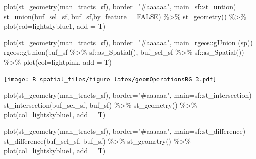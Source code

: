 \documentclass[
  11pt,
]{book}
\newenvironment{Shaded}{\begin{snugshade}}{\end{snugshade}}
\newcommand{\AttributeTok}[1]{\textcolor[rgb]{0.77,0.63,0.00}{#1}}
\newcommand{\ConstantTok}[1]{\textcolor[rgb]{0.00,0.00,0.00}{#1}}
\newcommand{\FunctionTok}[1]{\textcolor[rgb]{0.00,0.00,0.00}{#1}}
\newcommand{\NormalTok}[1]{#1}
\newcommand{\SpecialCharTok}[1]{\textcolor[rgb]{0.00,0.00,0.00}{#1}}
\newcommand{\StringTok}[1]{\textcolor[rgb]{0.31,0.60,0.02}{#1}}
\begin{document}
\begin{Shaded}
\begin{Highlighting}[]
\FunctionTok{plot}\NormalTok{(}\FunctionTok{st\_geometry}\NormalTok{(man\_tracts\_sf), }\AttributeTok{border=}\StringTok{"\#aaaaaa"}\NormalTok{, }\AttributeTok{main=}\StringTok{\textquotesingle{}sf::st\_untion\textquotesingle{}}\NormalTok{)}
\FunctionTok{st\_union}\NormalTok{(buf\_sel\_sf, buf\_sf,}\AttributeTok{by\_feature =} \ConstantTok{FALSE}\NormalTok{) }\SpecialCharTok{\%\textgreater{}\%} 
  \FunctionTok{st\_geometry}\NormalTok{() }\SpecialCharTok{\%\textgreater{}\%} 
  \FunctionTok{plot}\NormalTok{(}\AttributeTok{col=}\StringTok{\textquotesingle{}lightskyblue1\textquotesingle{}}\NormalTok{, }\AttributeTok{add =}\NormalTok{ T)}

\FunctionTok{plot}\NormalTok{(}\FunctionTok{st\_geometry}\NormalTok{(man\_tracts\_sf), }\AttributeTok{border=}\StringTok{"\#aaaaaa"}\NormalTok{, }\AttributeTok{main=}\StringTok{\textquotesingle{}rgeos::gUnion (sp)\textquotesingle{}}\NormalTok{)}
\NormalTok{rgeos}\SpecialCharTok{::}\FunctionTok{gUnion}\NormalTok{(buf\_sf }\SpecialCharTok{\%\textgreater{}\%}\NormalTok{ sf}\SpecialCharTok{::}\FunctionTok{as\_Spatial}\NormalTok{(), }
\NormalTok{              buf\_sel\_sf }\SpecialCharTok{\%\textgreater{}\%}\NormalTok{ sf}\SpecialCharTok{::}\FunctionTok{as\_Spatial}\NormalTok{()) }\SpecialCharTok{\%\textgreater{}\%} 
  \FunctionTok{plot}\NormalTok{(}\AttributeTok{col=}\StringTok{\textquotesingle{}lightpink\textquotesingle{}}\NormalTok{, }\AttributeTok{add =}\NormalTok{ T)}
\end{Highlighting}
\end{Shaded}

\texttt{[image: R-spatial\_files/figure-latex/geomOperationsBG-3.pdf]}

\begin{Shaded}
\begin{Highlighting}[]
\FunctionTok{plot}\NormalTok{(}\FunctionTok{st\_geometry}\NormalTok{(man\_tracts\_sf), }\AttributeTok{border=}\StringTok{"\#aaaaaa"}\NormalTok{, }\AttributeTok{main=}\StringTok{\textquotesingle{}sf::st\_intersection\textquotesingle{}}\NormalTok{)}
\FunctionTok{st\_intersection}\NormalTok{(buf\_sel\_sf, buf\_sf) }\SpecialCharTok{\%\textgreater{}\%} 
  \FunctionTok{st\_geometry}\NormalTok{() }\SpecialCharTok{\%\textgreater{}\%} 
  \FunctionTok{plot}\NormalTok{(}\AttributeTok{col=}\StringTok{\textquotesingle{}lightskyblue1\textquotesingle{}}\NormalTok{, }\AttributeTok{add =}\NormalTok{ T)}

\FunctionTok{plot}\NormalTok{(}\FunctionTok{st\_geometry}\NormalTok{(man\_tracts\_sf), }\AttributeTok{border=}\StringTok{"\#aaaaaa"}\NormalTok{, }\AttributeTok{main=}\StringTok{\textquotesingle{}sf::st\_difference\textquotesingle{}}\NormalTok{)}
\FunctionTok{st\_difference}\NormalTok{(buf\_sel\_sf, buf\_sf) }\SpecialCharTok{\%\textgreater{}\%} \FunctionTok{st\_geometry}\NormalTok{() }\SpecialCharTok{\%\textgreater{}\%} 
  \FunctionTok{plot}\NormalTok{(}\AttributeTok{col=}\StringTok{\textquotesingle{}lightskyblue1\textquotesingle{}}\NormalTok{, }\AttributeTok{add =}\NormalTok{ T)}
\end{Highlighting}
\end{Shaded}
\end{document}
